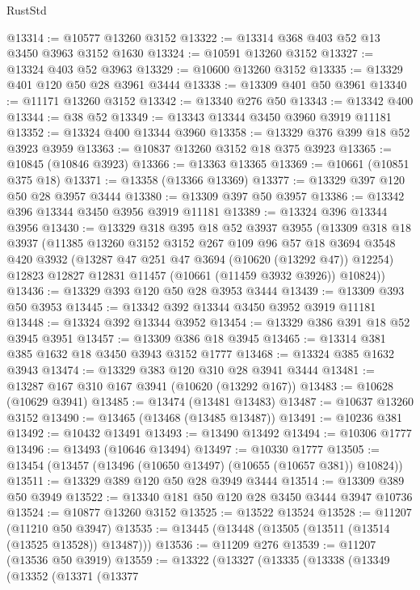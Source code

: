 \begin{lexlean}{RustStd}
\begin{coremodule}
@13314 := @10577 @13260 @3152
@13322 := @13314 @368 @403 @52 @13 @3450 @3963 @3152 @1630
@13324 := @10591 @13260 @3152
@13327 := @13324 @403 @52 @3963
@13329 := @10600 @13260 @3152
@13335 := @13329 @401 @120 @50 @28 @3961 @3444
@13338 := @13309 @401 @50 @3961
@13340 := @11171 @13260 @3152
@13342 := @13340 @276 @50
@13343 := @13342 @400
@13344 := @38 @52
@13349 := @13343 @13344 @3450 @3960 @3919 @11181
@13352 := @13324 @400 @13344 @3960
@13358 := @13329 @376 @399 @18 @52 @3923 @3959
@13363 := @10837 @13260 @3152 @18 @375 @3923
@13365 := @10845 (@10846 @3923)
@13366 := @13363 @13365
@13369 := @10661 (@10851 @375 @18)
@13371 := @13358 (@13366 @13369)
@13377 := @13329 @397 @120 @50 @28 @3957 @3444
@13380 := @13309 @397 @50 @3957
@13386 := @13342 @396 @13344 @3450 @3956 @3919 @11181
@13389 := @13324 @396 @13344 @3956
@13430 := @13329
    @318
    @395
    @18
    @52
    @3937
    @3955
    (@13309
      @318
      @18
      @3937
      (@11385
        @13260
        @3152
        @3152
        @267
        @109
        @96
        @57
        @18
        @3694
        @3548
        @420
        @3932
        (@13287 @47 @251 @47 @3694 (@10620 (@13292 @47)) @12254)
        @12823
        @12827
        @12831
        @11457
        (@10661 (@11459 @3932 @3926))
        @10824))
@13436 := @13329 @393 @120 @50 @28 @3953 @3444
@13439 := @13309 @393 @50 @3953
@13445 := @13342 @392 @13344 @3450 @3952 @3919 @11181
@13448 := @13324 @392 @13344 @3952
@13454 := @13329 @386 @391 @18 @52 @3945 @3951
@13457 := @13309 @386 @18 @3945
@13465 := @13314 @381 @385 @1632 @18 @3450 @3943 @3152 @1777
@13468 := @13324 @385 @1632 @3943
@13474 := @13329 @383 @120 @310 @28 @3941 @3444
@13481 := @13287 @167 @310 @167 @3941 (@10620 (@13292 @167))
@13483 := @10628 (@10629 @3941)
@13485 := @13474 (@13481 @13483)
@13487 := @10637 @13260 @3152
@13490 := @13465 (@13468 (@13485 @13487))
@13491 := @10236 @381
@13492 := @10432 @13491
@13493 := @13490 @13492
@13494 := @10306 @1777
@13496 := @13493 (@10646 @13494)
@13497 := @10330 @1777
@13505 := @13454 (@13457 (@13496 (@10650 @13497) (@10655 (@10657 @381)) @10824))
@13511 := @13329 @389 @120 @50 @28 @3949 @3444
@13514 := @13309 @389 @50 @3949
@13522 := @13340 @181 @50 @120 @28 @3450 @3444 @3947 @10736
@13524 := @10877 @13260 @3152
@13525 := @13522 @13524
@13528 := @11207 (@11210 @50 @3947)
@13535 := @13445 (@13448 (@13505 (@13511 (@13514 (@13525 @13528)) @13487)))
@13536 := @11209 @276
@13539 := @11207 (@13536 @50 @3919)
@13559 := @13322
    (@13327
      (@13335
        (@13338
          (@13349
            (@13352
              (@13371
                (@13377

\end{coremodule}
\end{lexlean}
